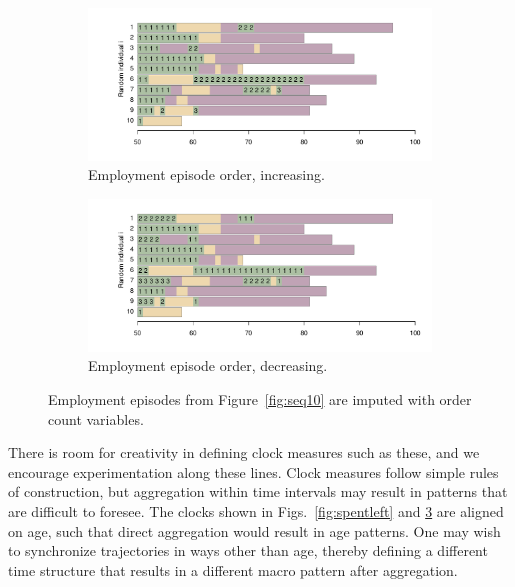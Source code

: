 \documentclass{article}
\begin{document}
\begin{figure}[ht!]
\centering

\begin{subfigure}{\textwidth}
\includegraphics[scale=.5]{Figures/Seq10ordUp.pdf}
\caption{Employment episode order, increasing.}
\label{fig:orderup}
\end{subfigure}

\begin{subfigure}{\textwidth}
\includegraphics[scale=.5]{Figures/Seq10ordDown.pdf}
\caption{Employment episode order, decreasing.}
\label{fig:orderdown}
\end{subfigure}

\caption{Employment episodes from Figure~\ref{fig:seq10}
are imputed with order count variables.}
\label{fig:order}
\end{figure}

There is room for creativity in defining clock measures such as these, and we encourage experimentation along these lines. Clock measures follow simple rules of construction, but aggregation within time intervals may result in patterns that are difficult to foresee. The clocks shown in Figs.~\ref{fig:spentleft} and \ref{fig:order} are aligned on age, such that direct aggregation would result in age patterns.  One may wish to synchronize trajectories in ways other than age, thereby defining a different time structure that results in a different macro pattern after aggregation.
\end{document}
